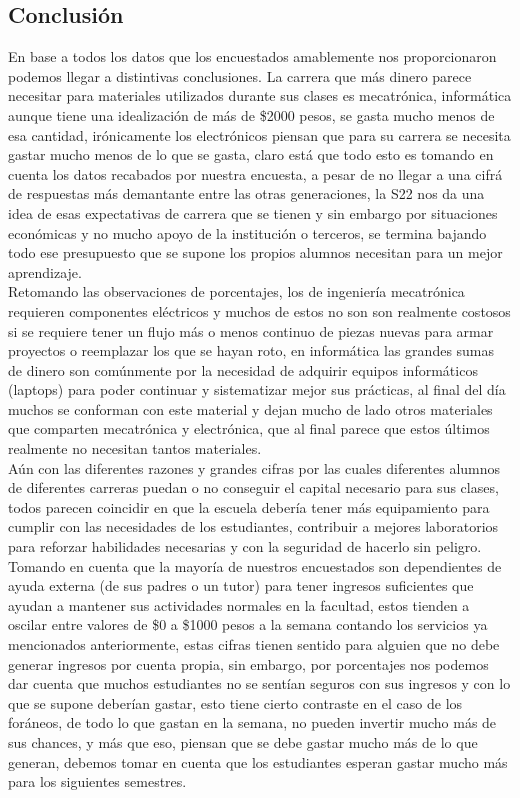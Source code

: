 \documentclass[letterpaper,12pt]{article}
\begin{document}
\begin{sloppypar}
\newpage
\begin{center}
    \section*{Conclusión}
\end{center}
En base a todos los datos que los encuestados amablemente nos proporcionaron podemos llegar a distintivas conclusiones. La carrera que más dinero parece necesitar para materiales utilizados durante sus clases es mecatrónica, informática aunque tiene una idealización de más de \$2000 pesos, se gasta mucho menos de esa cantidad, irónicamente los electrónicos piensan que para su carrera se necesita gastar mucho menos de lo que se gasta, claro está que todo esto es tomando en cuenta los datos recabados por nuestra encuesta, a pesar de no llegar a una cifrá de respuestas más demantante entre las otras generaciones, la S22 nos da una idea de esas expectativas de carrera que se tienen y sin embargo por situaciones económicas y no mucho apoyo de la institución o terceros, se termina bajando todo ese presupuesto que se supone los propios alumnos necesitan para un mejor aprendizaje. 
\vspace{0.3cm}\\
Retomando las observaciones de porcentajes, los de ingeniería mecatrónica requieren componentes eléctricos y muchos de estos no son son realmente costosos si se requiere tener un flujo más o menos continuo de piezas nuevas para armar proyectos o reemplazar los que se hayan roto, en informática las grandes sumas de dinero son comúnmente por la necesidad de adquirir equipos informáticos (laptops) para poder continuar y sistematizar mejor sus prácticas, al final del día muchos se conforman con este material y dejan mucho de lado otros materiales que comparten mecatrónica y electrónica, que al final parece que estos últimos realmente no necesitan tantos materiales. 
\vspace{0.3cm}\\
Aún con las diferentes razones y grandes cifras por las cuales diferentes alumnos de diferentes carreras puedan o no conseguir el capital necesario para sus clases, todos parecen coincidir en que la escuela debería tener más equipamiento para cumplir con las necesidades de los estudiantes, contribuir a mejores laboratorios para reforzar habilidades necesarias y con la seguridad de hacerlo sin peligro. Tomando en cuenta que la mayoría de nuestros encuestados son dependientes de ayuda externa (de sus padres o un tutor) para tener ingresos suficientes que ayudan a mantener sus actividades normales en la facultad, estos tienden a oscilar entre valores de \$0 a \$1000 pesos a la semana contando los servicios ya mencionados anteriormente, estas cifras tienen sentido para alguien que no debe generar ingresos por cuenta propia, sin embargo, por porcentajes nos podemos dar cuenta que muchos estudiantes no se sentían seguros con sus ingresos y con lo que se supone deberían gastar, esto tiene cierto contraste en  el caso de los foráneos, de todo lo que gastan en la semana, no pueden invertir mucho más de sus chances, y más que eso, piensan que se debe gastar mucho más de lo que generan, debemos tomar en cuenta que los estudiantes esperan gastar mucho más para los siguientes semestres. 

\end{sloppypar}
\end{document}
